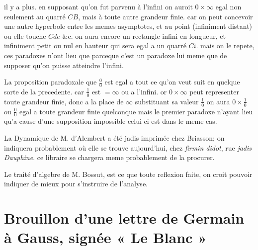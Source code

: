 \documentclass[11pt,a4paper]{article}
\begin{document}

il y a plus. en supposant qu'on fut parvenu à l'infini on auroit
$0 \times \infty$ egal non seulement au quarré $CB$, mais à toute autre
grandeur finie. car on peut concevoir une autre hyperbole entre les memes
asymptotes, et au point (infiniment distant) ou elle touche 
$Cde$ \&c. on aura encore un rectangle infini en longueur, et infiniment
petit ou nul en hauteur qui sera egal a un quarré $Ci$. mais on le repete,
ces paradoxes n'ont lieu que parceque c'est un paradoxe lui meme que de
supposer qu'on puisse atteindre l'infini.


La proposition paradoxale que $\frac{0}{0}$ est egal a tout ce qu'on veut
suit en quelque sorte de la precedente. car $\frac{1}{0}$ est $= \infty$ ou a
l'infini. or $0 \times \infty$ peut representer toute grandeur finie, donc a
la place de $\infty$ substituant sa valeur $\frac{1}{0}$ on aura
$0 \times \frac{1}{0}$ ou $\frac{0}{0}$ egal a toute grandeur finie
quelconque mais le premier paradoxe n'ayant lieu qu'a cause d'une supposition
impossible celui ci est dans le meme cas.


La Dynamique de M. d'Alembert a été jadis imprimée chez Briasson; on
indiquera probablement où elle se trouve aujourd'hui, \struck{\ill{}} chez
\emph{firmin didot}, rue \emph{jadis Dauphine}. ce libraire se chargera meme
probablement de la procurer.

Le traité d'algebre de M. Bossut, est ce que toute reflexion faite, on croit
pouvoir indiquer de mieux pour s'instruire de l'analyse.


\section{Brouillon d'une lettre de Germain à Gauss, signée « Le Blanc »}
\end{document}
